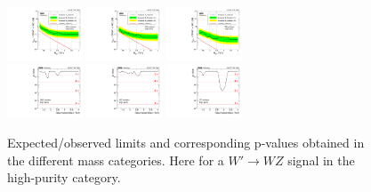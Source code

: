 \begin{figure}[h!]
\centering
\includegraphics[width=0.20\textwidth]{figures/analysis/search1/AN-15-211/limits/brazilianFlag_WZ_WWHP_13TeV_wPDF.pdf}
\includegraphics[width=0.20\textwidth]{figures/analysis/search1/AN-15-211/limits/brazilianFlag_WZ_WZHP_13TeV_wPDF.pdf}
\includegraphics[width=0.20\textwidth]{figures/analysis/search1/AN-15-211/limits/brazilianFlag_WZ_ZZHP_13TeV_wPDF.pdf}\\
\includegraphics[width=0.20\textwidth]{figures/analysis/search1/AN-15-211/pvalues/pvalue_WZinWW_high_purity.pdf}
\includegraphics[width=0.20\textwidth]{figures/analysis/search1/AN-15-211/pvalues/pvalue_WZinWZ_high_purity.pdf}
\includegraphics[width=0.20\textwidth]{figures/analysis/search1/AN-15-211/pvalues/pvalue_WZinZZ_high_purity.pdf}
\caption{Expected/observed limits and corresponding p-values obtained in the different mass categories. Here for a $W'\rightarrow WZ$ signal in the high-purity category.}
\label{fig:searchI:Limits_HPWZ}
\end{figure}


